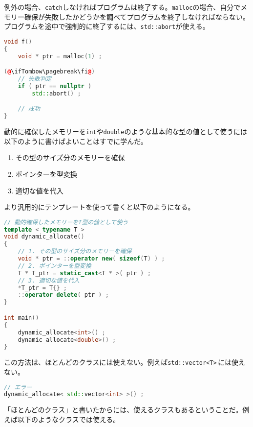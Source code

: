 例外の場合、\texttt{catch}しなければプログラムは終了する。\texttt{malloc}の場合、自分でメモリー確保が失敗したかどうかを調べてプログラムを終了しなければならない。プログラムを途中で強制的に終了するには、\texttt{std::abort}が使える。

\begin{lstlisting}[language={C++}]
void f()
{
    void * ptr = malloc(1) ;

(@\ifTombow\pagebreak\fi@)
    // 失敗判定
    if ( ptr == nullptr )
        std::abort() ;

    // 成功
}
\end{lstlisting}


動的に確保したメモリーを\texttt{int}や\texttt{double}のような基本的な型の値として使うには以下のように書けばよいことはすでに学んだ。

\begin{enumerate}
\def\labelenumi{\arabic{enumi}.}
\item
  その型のサイズ分のメモリーを確保
\item
  ポインターを型変換
\item
  適切な値を代入
\end{enumerate}

より汎用的にテンプレートを使って書くと以下のようになる。

\begin{lstlisting}[language={C++}]
// 動的確保したメモリーをT型の値として使う
template < typename T >
void dynamic_allocate()
{
    // 1. その型のサイズ分のメモリーを確保
    void * ptr = ::operator new( sizeof(T) ) ;
    // 2. ポインターを型変換
    T * T_ptr = static_cast<T * >( ptr ) ;
    // 3. 適切な値を代入
    *T_ptr = T{} ;
    ::operator delete( ptr ) ;
}

int main()
{
    dynamic_allocate<int>() ;
    dynamic_allocate<double>() ;
}
\end{lstlisting}

この方法は、ほとんどのクラスには使えない。例えば\texttt{std::vector<T>}\,には使えない。

\begin{lstlisting}[language={C++}]
// エラー
dynamic_allocate< std::vector<int> >() ;
\end{lstlisting}

\ifTombow\pagebreak\fi
「ほとんどのクラス」と書いたからには、使えるクラスもあるということだ。例えば以下のようなクラスでは使える。


